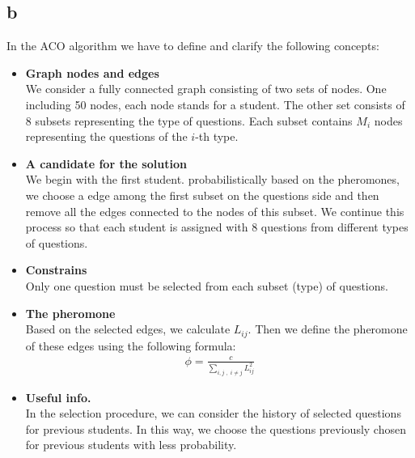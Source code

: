 \documentclass[]{article}
\begin{document}
	\subsection*{b}
	In the ACO algorithm we have to define and clarify the following concepts:
	\begin{itemize}
		\item \textbf{Graph nodes and edges}\\
		We consider a fully connected graph consisting of two sets of nodes. One including 50 nodes, each node stands for a student. The other set consists of 8 subsets representing the type of questions. Each subset contains $M_i$ nodes representing the questions of the $i$-th type.
	
		\item \textbf{A candidate for the solution} \\
		We begin with the first student. probabilistically based on the pheromones, we choose a edge among the first subset on the questions side and then remove all the edges connected to the nodes of this subset. We continue this process so that each student is assigned with 8 questions from different types of questions.
		
		\item \textbf{Constrains} \\
		Only one question must be selected from each subset (type) of questions.
		
		\item \textbf{The pheromone} \\
		Based on the selected edges, we calculate $L_{ij}$. Then we define the pheromone of these edges using the following formula:
		\begin{align*}
			\phi = \frac{c}{\sum_{i,j \,\, , \,\, i\ne j} L_{ij}^2}
		\end{align*}
		
		\item \textbf{Useful info.} \\
		In the selection procedure, we can consider the history of selected questions for previous students. In this way, we choose the questions previously chosen for previous students with less probability.
	\end{itemize}
	
	
\end{document}
